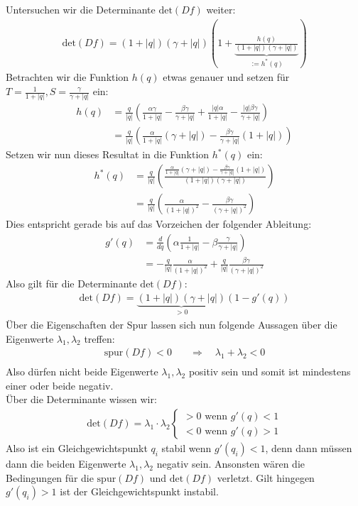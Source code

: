 \documentclass[a4paper,twoside]{article}
\begin{document}
	Untersuchen wir die Determinante \(\textrm{det}(Df)\) weiter:
	\begin{align*}
		\textrm{det}(Df) = (1 + |q|)(\gamma + |q|)\left( 1 + \underbrace{\frac{h(q)}{(1 + |q|)(\gamma + |q|)}}_{:=h^*(q)} \right)
	\end{align*}
	Betrachten wir die Funktion \(h(q)\) etwas genauer und setzen für \(T = \frac{1}{1+|q|}, S = \frac{\gamma}{\gamma + |q|}\) ein:
	\begin{align*}
		h(q) &= \frac{q}{|q|}\left(
			\frac{\alpha \gamma}{1 + |q|} - \frac{\beta \gamma}{\gamma + |q|} + 
			\frac{|q| \alpha}{1+|q|} - \frac{|q| \beta\gamma}{\gamma + |q|}
		\right) \\
		&=\frac{q}{|q|}\left(
			\frac{\alpha}{1 + |q|}(\gamma + |q|) -
			 \frac{\beta \gamma}{\gamma + |q|}(1+|q|)
		\right)
	\end{align*}
	Setzen wir nun dieses Resultat in die Funktion \(h^*(q)\) ein:
	\begin{align*}
		h^*(q) &= \frac{q}{|q|}\left(
			\frac{\frac{\alpha}{1 + |q|}(\gamma + |q|) -
			 \frac{\beta \gamma}{\gamma + |q|}(1+|q|)}
			{(1 + |q|)(\gamma + |q|)}
		\right) \\
		&= \frac{q}{|q|} \left(
			\frac{\alpha}{(1+|q|)^2} - \frac{\beta \gamma}{(\gamma + |q|)^2}
		\right)
	\end{align*}
	Dies entspricht gerade bis auf das Vorzeichen der folgender Ableitung:
	\begin{align*}
		g'(q) &= \frac{d}{dq} \left(\alpha\frac{1}{1+|q|} - \beta\frac{\gamma}{\gamma+|q|}\right) \\
		&= -\frac{q}{|q|} \frac{\alpha}{(1+|q|)^2} + \frac{q}{|q|} \frac{\beta \gamma}{(\gamma + |q|)^2}
	\end{align*}
	Also gilt für die Determinante \(\textrm{det}(Df)\):
	\begin{align*}
		\textrm{det}(Df) = \underbrace{(1+|q|)(\gamma+|q|)}_{> 0}(1-g'(q))
	\end{align*}
	Über die Eigenschaften der Spur lassen sich nun folgende Aussagen über die Eigenwerte \(\lambda_1, \lambda_2\) treffen:
	\begin{align*}
		\textrm{spur}(Df) < 0 \quad &\Rightarrow \quad  \lambda_1 + \lambda_2 < 0 \\
	\end{align*}
	Also dürfen nicht beide Eigenwerte \(\lambda_1, \lambda_2\) positiv sein und somit ist mindestens einer oder beide negativ. \\
	Über die Determinante wissen wir:
	\begin{align*}
		\textrm{det}(Df) = \lambda_1 \cdot \lambda_2 \left\{ \begin{array}{l}
			> 0 \textrm{ wenn } g'(q) < 1 \\
			< 0 \textrm{ wenn } g'(q) > 1
		\end{array} \right.
	\end{align*}
	Also ist ein Gleichgewichtspunkt \(q_i\) stabil wenn \(g'(q_i) < 1\), denn dann müssen dann die beiden Eigenwerte \(\lambda_1, \lambda_2\) negativ sein. Ansonsten wären die Bedingungen für die \(\textrm{spur}(Df)\) und \(\textrm{det}(Df)\) verletzt. Gilt hingegen\(g'(q_i) > 1\) ist der Gleichgewichtspunkt instabil.
	
\end{document}
